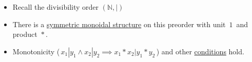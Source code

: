\begin{itemize}
    \item Recall the divisibility order $(\mathbb{N}, |)$
    \item There is a \hyperref[D2.2]{symmetric monoidal structure} on this preorder with unit \,$1$\, and product \,$*$\,.
    \item  Monotonicity (\,$x_1|y_1 \land x_2|y_2 \implies x_1*x_2 | y_1*y_2$\,) and other \hyperref[D2.2]{conditions} hold.  \end{itemize}
